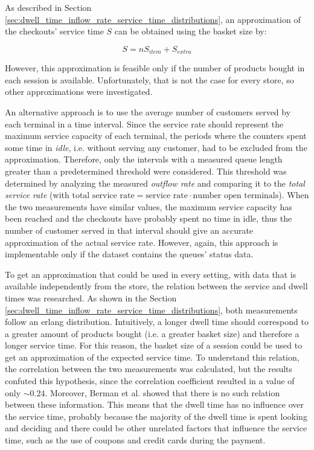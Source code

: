 As described in Section \ref{sec:dwell_time_inflow_rate_service_time_distributions}, an approximation of the checkouts' service time \( S \) can be obtained using the basket size by:

\begin{equation}
  S = n S_{item} + S_{extra}
\end{equation}

However, this approximation is feasible only if the number of products bought in each session is available. Unfortunately, that is not the case for every store, so other approximations were investigated.

An alternative approach is to use the average number of customers served by each terminal in a time interval. Since the service rate should represent the maximum service capacity of each terminal, the periods where the counters spent some time in \emph{idle}, i.e. without serving any customer, had to be excluded from the approximation. Therefore, only the intervals with a measured queue length greater than a predetermined threshold were considered. This threshold was determined by analyzing the measured \emph{outflow rate} and comparing it to the \emph{total service rate} (with \(\text{total service rate} = \text{service rate} \cdot \text{number open terminals} \)). When the two measurements have similar values, the maximum service capacity has been reached and the checkouts have probably spent no time in idle, thus the number of customer served in that interval should give an accurate approximation of the actual service rate. However, again, this approach is implementable only if the dataset contains the queues’ status data.

To get an approximation that could be used in every setting, with data that is available independently from the store, the relation between the service and dwell times was researched. As shown in the Section \ref{sec:dwell_time_inflow_rate_service_time_distributions}, both measurements follow an erlang distribution. Intuitively, a longer dwell time should correspond to a greater amount of products bought (i.e. a greater basket size) and therefore a longer service time. For this reason, the basket size of a session could be used to get an approximation of the expected service time. To understand this relation, the correlation between the two measurements was calculated, but the results confuted this hypothesis, since the correlation coefficient resulted in a value of only \( \sim0.24 \). Moreover, Berman et al. \cite{berman} showed that there is no such relation between these information. This means that the dwell time has no influence over the service time, probably because the majority of the dwell time is spent looking and deciding and there could be other unrelated factors that influence the service time, such as the use of coupons and credit cards during the payment.

